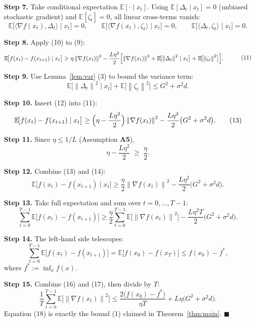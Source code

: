 \documentclass{article}
\newcommand{\E}{\mathbb{E}}
\newcommand{\norm}[1]{\left\|#1\right\|}
\newcommand{\grad}{\nabla}
\begin{document}
\noindent\textbf{Step 7.}  Take conditional expectation $\E[\cdot\mid x_t]$.  
Using $\E[\Delta_t\mid x_t]=0$ (unbiased stochastic gradient) and
$\E[\zeta_t]=0$, all linear cross‑terms vanish:
\[
\E\!\bigl[\langle\grad f(x_t),\Delta_t\rangle\mid x_t\bigr]=0,
\qquad
\E\!\bigl[\langle\grad f(x_t),\zeta_t\rangle\mid x_t\bigr]=0,
\qquad
\E\!\bigl[\langle\Delta_t,\zeta_t\rangle\mid x_t\bigr]=0 .
\tag{10}
\]

\noindent\textbf{Step 8.}  Apply (10) to (9):
\[
\begin{aligned}
\E\!\bigl[f(x_t)-f(x_{t+1})\mid x_t\bigr]
&\ge \eta\norm{\grad f(x_t)}^{2}
   -\frac{L\eta^{2}}{2}\Bigl[
        \norm{\grad f(x_t)}^{2}
        +\E\!\bigl[\norm{\Delta_t}^{2}\mid x_t\bigr]
        +\E\!\bigl[\norm{\zeta_t}^{2}\bigr]
      \Bigr] .
\end{aligned}
\tag{11}
\]

\noindent\textbf{Step 9.}  Use Lemma~\ref{lem:var} (3) to bound the variance term:
\[
\E\!\bigl[\norm{\Delta_t}^{2}\mid x_t\bigr] + \E\!\bigl[\norm{\zeta_t}^{2}\bigr]
\le G^{2}+\sigma^{2}d .
\tag{12}
\]

\noindent\textbf{Step 10.}  Insert (12) into (11):
\[
\E\!\bigl[f(x_t)-f(x_{t+1})\mid x_t\bigr]
\ge
\Bigl(\eta-\frac{L\eta^{2}}{2}\Bigr)\norm{\grad f(x_t)}^{2}
-\frac{L\eta^{2}}{2}\bigl(G^{2}+\sigma^{2}d\bigr) .
\tag{13}
\]

\noindent\textbf{Step 11.}  Since $\eta\le 1/L$ (Assumption \textbf{A5}),
\[
\eta-\frac{L\eta^{2}}{2}\;\ge\;\frac{\eta}{2}.
\tag{14}
\]

\noindent\textbf{Step 12.}  Combine (13) and (14):
\[
\E\!\bigl[f(x_t)-f(x_{t+1})\mid x_t\bigr]
\ge
\frac{\eta}{2}\norm{\grad f(x_t)}^{2}
-\frac{L\eta^{2}}{2}\bigl(G^{2}+\sigma^{2}d\bigr) .
\tag{15}
\]

\noindent\textbf{Step 13.}  Take full expectation and sum over $t=0,\dots,T-1$:
\[
\sum_{t=0}^{T-1}\E\!\bigl[f(x_t)-f(x_{t+1})\bigr]
\ge
\frac{\eta}{2}\sum_{t=0}^{T-1}\E\!\bigl[\norm{\grad f(x_t)}^{2}\bigr]
-\frac{L\eta^{2}T}{2}\bigl(G^{2}+\sigma^{2}d\bigr) .
\tag{16}
\]

\noindent\textbf{Step 14.}  The left‑hand side telescopes:
\[
\sum_{t=0}^{T-1}\E\!\bigl[f(x_t)-f(x_{t+1})\bigr]
= \E\!\bigl[f(x_0)-f(x_T)\bigr]
\le f(x_0)-f^{*},
\tag{17}
\]
where $f^{*}:=\inf_{x}f(x)$.

\noindent\textbf{Step 15.}  Combine (16) and (17), then divide by $T$:
\[
\frac{1}{T}\sum_{t=0}^{T-1}\E\!\bigl[\norm{\grad f(x_t)}^{2}\bigr]
\le
\frac{2\bigl(f(x_0)-f^{*}\bigr)}{\eta T}
+L\eta\bigl(G^{2}+\sigma^{2}d\bigr) .
\tag{18}
\]
Equation (18) is exactly the bound (1) claimed in Theorem~\ref{thm:main}.
\hfill $\blacksquare$
\end{document}
